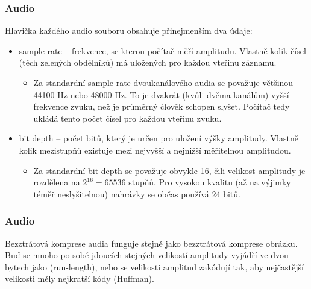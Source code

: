 \documentclass[aspectratio=169,11pt,svgnames,handout]{beamer}
\begin{document}
\begin{frame}
 \frametitle{Audio}
 Hlavička každého audio souboru obsahuje přinejmenším dva údaje:
 \pause
 \begin{itemize}[label=\textbullet]
  \item \alert{sample rate} -- frekvence, se kterou počítač měří amplitudu.
   Vlastně kolik čísel (těch zelených obdélníků) má uložených pro každou vteřinu
   záznamu.
  \pause
  \begin{itemize}[label=\textemdash]
   \item Za standardní sample rate dvoukanálového audia se považuje většinou
    44100 Hz nebo 48000 Hz. To je dvakrát (kvůli dvěma kanálům) vyšší frekvence
    zvuku, než je průměrný člověk schopen slyšet. Počítač tedy ukládá tento
    počet čísel pro každou vteřinu zvuku.
  \end{itemize}
 \pause
 \item \alert{bit depth} -- počet bitů, který je určen pro uložení výšky
  amplitudy. Vlastně kolik mezistupňů existuje mezi nejvyšší a nejnižší
  měřitelnou amplitudou.
  \pause
  \begin{itemize}[label=\textbullet]
   \item Za standardní bit depth se považuje obvykle 16, čili velikost amplitudy
    je rozdělena na $2^{16} = 65536$ stupňů. Pro vysokou kvalitu (až na výjimky
    téměř neslyšitelnou) nahrávky se občas používá 24 bitů.
  \end{itemize}
 \end{itemize}
\end{frame}

\begin{frame}
 \frametitle{Audio}
 Bezztrátová komprese audia funguje stejně jako bezztrátová komprese
 obrázku.\pause\\
 Buď se mnoho po sobě jdoucích stejných velikostí amplitudy vyjádří ve dvou
 bytech jako  (run-length), \pause
 nebo se velikosti amplitud zakódují tak, aby nejčastější velikosti měly
 nejkratší kódy (Huffman).
\end{frame}
\end{document}
